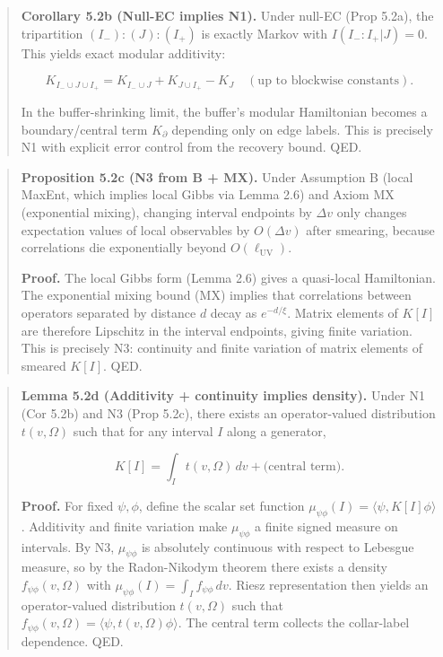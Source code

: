 \documentclass[
]{article}
\begin{document}
\begin{quote}
\textbf{Corollary 5.2b (Null-EC implies N1).} Under null-EC (Prop 5.2a),
the tripartition \((I_-):(J):(I_+)\) is exactly Markov with
\(I(I_-:I_+ | J) = 0\). This yields exact modular additivity:

\[
K_{I_- \cup J \cup I_+} = K_{I_- \cup J} + K_{J \cup I_+} - K_J
\quad (\text{up to blockwise constants}).
\]

In the buffer-shrinking limit, the buffer's modular Hamiltonian becomes
a boundary/central term \(K_\partial\) depending only on edge labels.
This is precisely N1 with explicit error control from the recovery
bound. QED.
\end{quote}

\begin{quote}
\textbf{Proposition 5.2c (N3 from B + MX).} Under Assumption B (local
MaxEnt, which implies local Gibbs via Lemma 2.6) and Axiom MX
(exponential mixing), changing interval endpoints by \(\Delta v\) only
changes expectation values of local observables by \(O(\Delta v)\) after
smearing, because correlations die exponentially beyond
\(O(\ell_{\mathrm{UV}})\).

\textbf{Proof.} The local Gibbs form (Lemma 2.6) gives a quasi-local
Hamiltonian. The exponential mixing bound (MX) implies that correlations
between operators separated by distance \(d\) decay as \(e^{-d/\xi}\).
Matrix elements of \(K[I]\) are therefore Lipschitz in the interval
endpoints, giving finite variation. This is precisely N3: continuity and
finite variation of matrix elements of smeared \(K[I]\). QED.
\end{quote}

\begin{quote}
\textbf{Lemma 5.2d (Additivity + continuity implies density).} Under N1
(Cor 5.2b) and N3 (Prop 5.2c), there exists an operator-valued
distribution \(t(v,\Omega)\) such that for any interval \(I\) along a
generator,

\[
K[I] = \int_I t(v,\Omega)\,dv + \text{(central term)}.
\]

\textbf{Proof.} For fixed \(\psi,\phi\), define the scalar set function
\(\mu_{\psi\phi}(I) = \langle \psi, K[I] \phi \rangle\). Additivity and
finite variation make \(\mu_{\psi\phi}\) a finite signed measure on
intervals. By N3, \(\mu_{\psi\phi}\) is absolutely continuous with
respect to Lebesgue measure, so by the Radon-Nikodym theorem there
exists a density \(f_{\psi\phi}(v,\Omega)\) with
\(\mu_{\psi\phi}(I)=\int_I f_{\psi\phi}\,dv\). Riesz representation then
yields an operator-valued distribution \(t(v,\Omega)\) such that
\(f_{\psi\phi}(v,\Omega)=\langle \psi, t(v,\Omega)
\phi \rangle\). The central term collects the collar-label dependence.
QED.
\end{quote}
\end{document}
